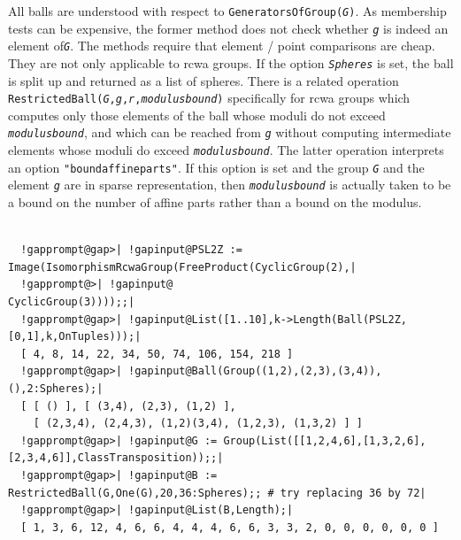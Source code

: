 \documentclass[a4paper,11pt]{report}
\begin{document}
{{{ All balls are understood with respect to \texttt{GeneratorsOfGroup(\mbox{\texttt{\mdseries\slshape G}})}. As membership tests can be expensive, the former method does not check
whether \mbox{\texttt{\mdseries\slshape g}} is indeed an element of{\nobreakspace}\mbox{\texttt{\mdseries\slshape G}}. The methods require that element\texttt{} / point comparisons are
cheap. They are not only applicable to rcwa groups. If the option \mbox{\texttt{\mdseries\slshape Spheres}} is set, the ball is split up and returned as a list of spheres. There is a
related operation \texttt{RestrictedBall(\mbox{\texttt{\mdseries\slshape G}},\mbox{\texttt{\mdseries\slshape g}},\mbox{\texttt{\mdseries\slshape r}},\mbox{\texttt{\mdseries\slshape modulusbound}})} specifically for rcwa groups which computes only those elements of the ball
whose moduli do not exceed \mbox{\texttt{\mdseries\slshape modulusbound}}, and which can be reached from \mbox{\texttt{\mdseries\slshape g}} without computing intermediate elements whose moduli do exceed \mbox{\texttt{\mdseries\slshape modulusbound}}. The latter operation interprets an option \texttt{"boundaffineparts"}. \texttt{}\texttt{} If this option is set and the group \mbox{\texttt{\mdseries\slshape G}} and the element \mbox{\texttt{\mdseries\slshape g}} are in sparse representation, then \mbox{\texttt{\mdseries\slshape modulusbound}} is actually taken to be a bound on the number of affine parts rather than a
bound on the modulus.  
\begin{Verbatim}[commandchars=!@|,fontsize=\small,frame=single,label=Example]
  
  !gapprompt@gap>| !gapinput@PSL2Z := Image(IsomorphismRcwaGroup(FreeProduct(CyclicGroup(2),|
  !gapprompt@>| !gapinput@                                                   CyclicGroup(3))));;|
  !gapprompt@gap>| !gapinput@List([1..10],k->Length(Ball(PSL2Z,[0,1],k,OnTuples)));|
  [ 4, 8, 14, 22, 34, 50, 74, 106, 154, 218 ]
  !gapprompt@gap>| !gapinput@Ball(Group((1,2),(2,3),(3,4)),(),2:Spheres);|
  [ [ () ], [ (3,4), (2,3), (1,2) ],
    [ (2,3,4), (2,4,3), (1,2)(3,4), (1,2,3), (1,3,2) ] ]
  !gapprompt@gap>| !gapinput@G := Group(List([[1,2,4,6],[1,3,2,6],[2,3,4,6]],ClassTransposition));;|
  !gapprompt@gap>| !gapinput@B := RestrictedBall(G,One(G),20,36:Spheres);; # try replacing 36 by 72|
  !gapprompt@gap>| !gapinput@List(B,Length);|
  [ 1, 3, 6, 12, 4, 6, 6, 4, 4, 4, 6, 6, 3, 3, 2, 0, 0, 0, 0, 0, 0 ]
  
\end{Verbatim}
 }

}}
\end{document}
